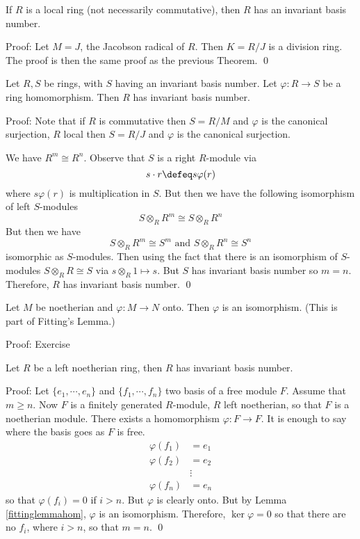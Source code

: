 \begin{thm}
If $R$ is a local ring (not necessarily commutative), then $R$ has an invariant basis number.
\end{thm}

Proof: Let $M=J$, the Jacobson radical of $R$. Then $K=R/J$ is a division ring. The proof is then the same proof as the previous Theorem. \qed \\

\begin{thm}
Let $R,S$ be rings, with $S$ having an invariant basis number. Let $\varphi: R \rightarrow S$ be a ring homomorphism. Then $R$ has invariant basis number.
\end{thm}

Proof: Note that if $R$ is commutative then $S=R/M$ and $\varphi$ is the canonical surjection, $R$ local then $S=R/J$ and $\varphi$ is the canonical surjection.

We have $R^m \cong R^n$. Observe that $S$ is a right $R$-module via
\[
s \cdot r \defeq s\varphi(r)
\]
where $s \varphi(r)$ is multiplication in $S$. But then we have the following isomorphism of left $S$-modules
\[
S \otimes_R R^m \cong S \otimes_R R^n
\]
But then we have
\[
S \otimes_R R^m \cong S^m \text{     and     } S \otimes_R R^n \cong S^n
\]
isomorphic as $S$-modules. Then using the fact that there is an isomorphism of $S$-modules $S \otimes_R R \cong S$ via $s \otimes_R 1 \mapsto s$. But $S$ has invariant basis number so $m=n$. Therefore, $R$ has invariant basis number. \qed \\

\begin{lem}\label{fittinglemmahom}
Let $M$ be noetherian and $\varphi: M \rightarrow N$ onto. Then $\varphi$ is an isomorphism. (This is part of Fitting's Lemma.)
\end{lem}

Proof: Exercise \\

\begin{thm}
Let $R$ be a left noetherian ring, then $R$ has invariant basis number.
\end{thm}

Proof: Let $\{e_1,\cdots,e_n\}$ and $\{f_1,\cdots,f_n\}$ two basis of a free module $F$. Assume that $m \geq n$. Now $F$ is a finitely generated $R$-module, $R$ left noetherian, so that $F$ is a noetherian module. There exists a homomorphism $\varphi: F \rightarrow F$. It is enough to say where the basis goes as $F$ is free.
\[
\begin{split}
\varphi(f_1)&=e_1 \\
\varphi(f_2)&=e_2 \\
&\vdots \\
\varphi(f_n)&=e_n
\end{split}
\]
so that $\varphi(f_i)=0$ if $i>n$. But $\varphi$ is clearly onto. But by Lemma \ref{fittinglemmahom}, $\varphi$ is an isomorphism. Therefore, $\ker \varphi=0$ so that there are no $f_i$, where $i>n$, so that $m=n$. \qed \\

